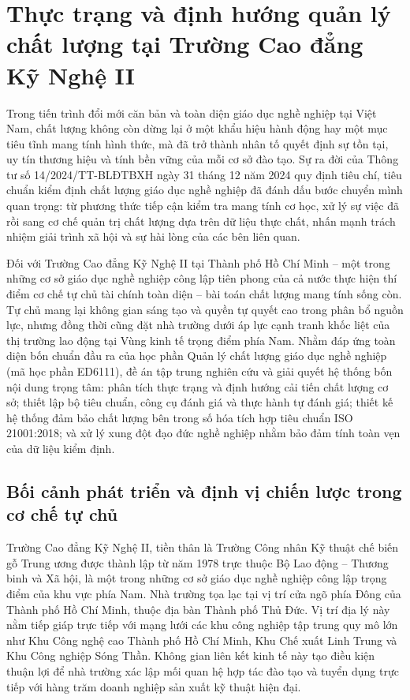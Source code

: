 \section{Thực trạng và định hướng quản lý chất lượng tại Trường Cao đẳng Kỹ Nghệ II}

Trong tiến trình đổi mới căn bản và toàn diện giáo dục nghề nghiệp tại Việt Nam, chất lượng không còn dừng lại ở một khẩu hiệu hành động hay một mục tiêu tĩnh mang tính hình thức, mà đã trở thành nhân tố quyết định sự tồn tại, uy tín thương hiệu và tính bền vững của mỗi cơ sở đào tạo. Sự ra đời của Thông tư số 14/2024/TT-BLĐTBXH ngày 31 tháng 12 năm 2024 quy định tiêu chí, tiêu chuẩn kiểm định chất lượng giáo dục nghề nghiệp đã đánh dấu bước chuyển mình quan trọng: từ phương thức tiếp cận kiểm tra mang tính cơ học, xử lý sự việc đã rồi sang cơ chế quản trị chất lượng dựa trên dữ liệu thực chất, nhấn mạnh trách nhiệm giải trình xã hội và sự hài lòng của các bên liên quan.

Đối với Trường Cao đẳng Kỹ Nghệ II tại Thành phố Hồ Chí Minh -- một trong những cơ sở giáo dục nghề nghiệp công lập tiên phong của cả nước thực hiện thí điểm cơ chế tự chủ tài chính toàn diện -- bài toán chất lượng mang tính sống còn. Tự chủ mang lại không gian sáng tạo và quyền tự quyết cao trong phân bổ nguồn lực, nhưng đồng thời cũng đặt nhà trường dưới áp lực cạnh tranh khốc liệt của thị trường lao động tại Vùng kinh tế trọng điểm phía Nam. Nhằm đáp ứng toàn diện bốn chuẩn đầu ra của học phần Quản lý chất lượng giáo dục nghề nghiệp (mã học phần ED6111), đề án tập trung nghiên cứu và giải quyết hệ thống bốn nội dung trọng tâm: phân tích thực trạng và định hướng cải tiến chất lượng cơ sở; thiết lập bộ tiêu chuẩn, công cụ đánh giá và thực hành tự đánh giá; thiết kế hệ thống đảm bảo chất lượng bên trong số hóa tích hợp tiêu chuẩn ISO 21001:2018; và xử lý xung đột đạo đức nghề nghiệp nhằm bảo đảm tính toàn vẹn của dữ liệu kiểm định.

\subsection{Bối cảnh phát triển và định vị chiến lược trong cơ chế tự chủ}

Trường Cao đẳng Kỹ Nghệ II, tiền thân là Trường Công nhân Kỹ thuật chế biến gỗ Trung ương được thành lập từ năm 1978 trực thuộc Bộ Lao động -- Thương binh và Xã hội, là một trong những cơ sở giáo dục nghề nghiệp công lập trọng điểm của khu vực phía Nam. Nhà trường tọa lạc tại vị trí cửa ngõ phía Đông của Thành phố Hồ Chí Minh, thuộc địa bàn Thành phố Thủ Đức. Vị trí địa lý này nằm tiếp giáp trực tiếp với mạng lưới các khu công nghiệp tập trung quy mô lớn như Khu Công nghệ cao Thành phố Hồ Chí Minh, Khu Chế xuất Linh Trung và Khu Công nghiệp Sóng Thần. Không gian liên kết kinh tế này tạo điều kiện thuận lợi để nhà trường xác lập mối quan hệ hợp tác đào tạo và tuyển dụng trực tiếp với hàng trăm doanh nghiệp sản xuất kỹ thuật hiện đại.

